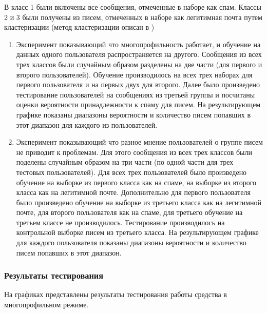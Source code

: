 В класс 1 были включены все сообщения, отмеченные в наборе \cite{SAPC} как спам. Классы 2 и 3 были получены из писем, отмеченных в наборе \cite{SAPC} как легитимная почта путем кластеризации (метод кластеризации описан в \cite{ROZ})
\begin{enumerate}
	\item Эксперимент показывающий что многопрофильность работает, и обучение на данных одного пользователя распространяется на другого. Сообщения из всех трех классов были случайным образом разделены на две части (для первого и второго пользователей). Обучение производилось на всех трех наборах для первого пользователя и на первых двух для второго. Далее было произведено тестирование пользователей на сообщениях из третьей группы и посчитаны оценки вероятности принадлежности к спаму для писем. На результирующем графике показаны диапазоны вероятности и количество писем попавших в этот диапазон для каждого из пользователей.

	\item Эксперимент показывающий что разное мнение пользователей о группе писем не приводит к проблемам. Для этого сообщения из всех трех классов были поделены случайным образом на три части (по одной части для трех тестовых пользователей). Для всех трех пользователей было произведено обучение на выборке из первого класса как на спаме, на выборке из второго класса как на легитимной почте. Дополнительно для первого пользователя было произведено обучение на выборке из третьего класса как на легитимной почте, для второго пользователя как на спаме, для третьего обучение на третьем классе не производилось. Тестирование производилось на контрольной выборке писем из третьего класса. На результирующем графике для каждого пользователя показаны диапазоны вероятности и количество писем попавших в этот диапазон.
	
\end{enumerate}
\subsubsection{Результаты тестирования}
На графиках представлены результаты тестирования работы средства в многопрофильном режиме. 

